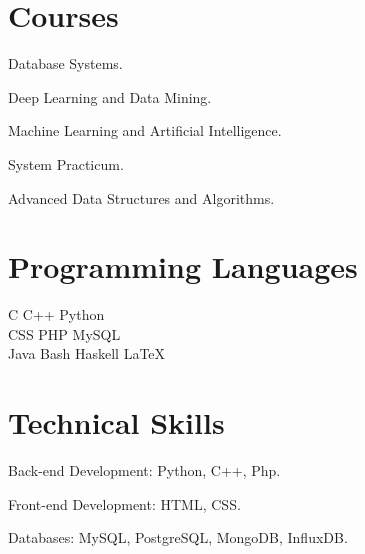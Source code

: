 \documentclass[]{deedy-resume-openfont}
\begin{document}
\begin{minipage}[t]{0.45\textwidth}
\section{Courses}
\vspace{\topsep} %
\begin{tightemize}
\item \large Database Systems.
\item Deep Learning and Data Mining.
\item Machine Learning and Artificial Intelligence.
\item System Practicum.
\item Advanced Data Structures and Algorithms.
\end{tightemize}
\end{minipage}
\hfill
\begin{minipage}[t]{0.45\textwidth}



\section{Programming Languages}
\large \hspace{2mm} \textbullet{} C \textbullet{}  C++ \textbullet{} Python \\
\large \hspace{2mm} \textbullet{} CSS \textbullet{} PHP \textbullet{} MySQL\\
\large \hspace{2mm} \textbullet{} Java  \textbullet{} Bash \textbullet{} Haskell \textbullet{} \LaTeX\\
\sectionsep
\end{minipage}

\newpage

\vspace*{8mm}
\section{Technical Skills}
\large{{Back-end Development}}: Python, C++, Php.

\large{{Front-end Development}}: HTML, CSS.

\large{{Databases}}: MySQL, PostgreSQL, MongoDB, InfluxDB.
\end{document}
